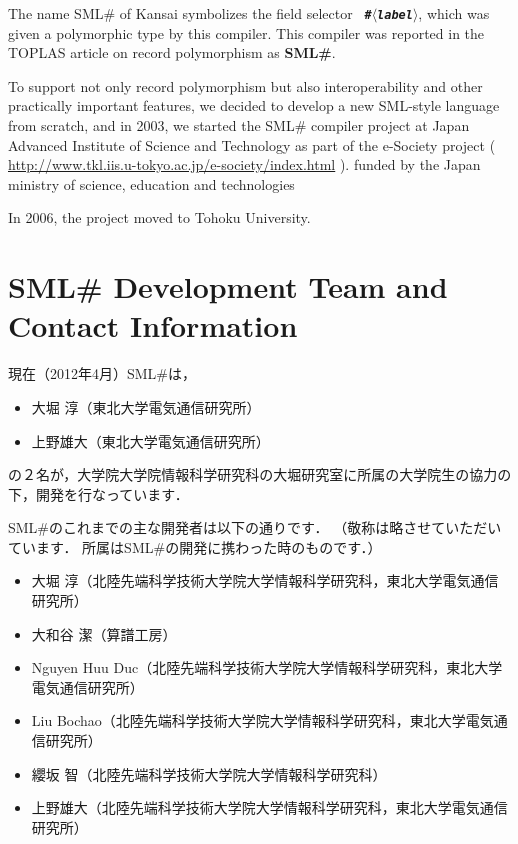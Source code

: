 \documentclass{jbook}
\newcommand{\txt}[2]{#2}
\newcommand{\smlsharp}{SML\#}
\newcommand{\nonterm}[1]{\mbox{$\langle$}{\it #1}\mbox{$\rangle$}}
\begin{document}
	The name SML\# of Kansai symbolizes the field selector {\bf\tt
\#\nonterm{label}}, which was given a polymorphic type by this
compiler.
	This compiler was reported in the TOPLAS article on record
polymorphism \cite{ohor95toplas} as {\bf \smlsharp{}}.

	To support not only record polymorphism but also
interoperability and other practically important features, we decided 
to develop a new SML-style language from scratch, and in 2003, we
started the \smlsharp{} compiler project at Japan Advanced Institute of 
Science and Technology as part of the e-Society project 
(
\url{http://www.tkl.iis.u-tokyo.ac.jp/e-society/index.html}
).
funded by the Japan ministry of science, education and technologies

	In 2006, the project moved to Tohoku University.
\fi%

\section{
\txt{\smlsharp{}開発チームと連絡先情報}
{\smlsharp{} Development Team and Contact Information}
}
\label{sec:smlsharpTeam}

\ifx\jp%
	現在（2012年4月）\smlsharp{}は，
\begin{itemize}
\item 
大堀 淳（東北大学電気通信研究所）
\item 
上野雄大（東北大学電気通信研究所）
\end{itemize}
の２名が，大学院大学院情報科学研究科の大堀研究室に所属の大学院生の協力の
下，開発を行なっています．

	\smlsharp{}のこれまでの主な開発者は以下の通りです．
	（敬称は略させていただいています．
	所属は\smlsharp{}の開発に携わった時のものです．）
\begin{itemize}
\item 大堀 淳（北陸先端科学技術大学院大学情報科学研究科，東北大学電気通信研究所）
\item 大和谷 潔（算譜工房）
\item Nguyen Huu Duc（北陸先端科学技術大学院大学情報科学研究科，東北大学電気通信研究所）
\item Liu Bochao（北陸先端科学技術大学院大学情報科学研究科，東北大学電気通信研究所）
\item 纓坂 智（北陸先端科学技術大学院大学情報科学研究科）
\item 上野雄大（北陸先端科学技術大学院大学情報科学研究科，東北大学電気通信研究所）
\end{itemize}
\end{document}
